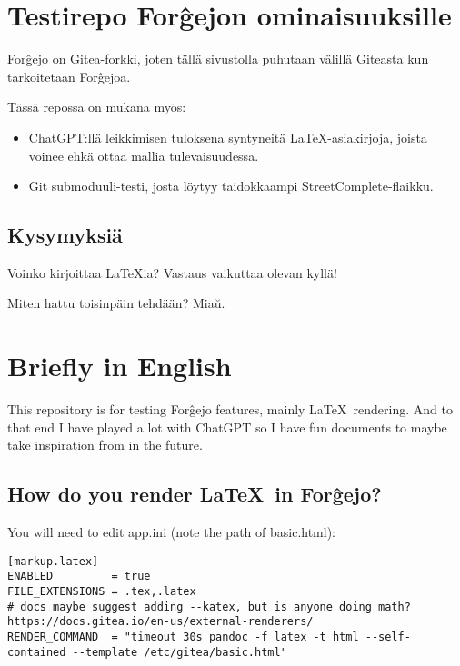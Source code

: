 \documentclass[a4paper,colorlinks,linkcolor=blue]{artikel3}
\begin{document}
\hypersetup{urlcolor=blue}

\section*{Testirepo For\^gejon ominaisuuksille}

For\^gejo on Gitea-forkki, joten tällä sivustolla puhutaan välillä Giteasta kun tarkoitetaan For\^gejoa.

Tässä repossa on mukana myös:


\begin{itemize}
    \item ChatGPT:llä leikkimisen tuloksena syntyneitä \LaTeX -asiakirjoja, joista voinee ehkä ottaa mallia tulevaisuudessa.
    \item Git submoduuli-testi, josta löytyy taidokkaampi StreetComplete-flaikku.
\end{itemize}

\subsection*{Kysymyksiä}
Voinko kirjoittaa \LaTeX ia?
Vastaus vaikuttaa olevan kyllä!

Miten hattu toisinpäin tehdään?
Mia\u{u}.


\section*{Briefly in English}

This repository is for testing For\^gejo features, mainly \LaTeX\ rendering.
And to that end I have played a lot with ChatGPT so I have fun documents to maybe take inspiration from in the future.

\subsection*{How do you render \LaTeX\ in For\^gejo?}

You will need to edit app.ini (note the path of basic.html):

\begin{verbatim}
[markup.latex]
ENABLED         = true
FILE_EXTENSIONS = .tex,.latex
# docs maybe suggest adding --katex, but is anyone doing math? https://docs.gitea.io/en-us/external-renderers/
RENDER_COMMAND  = "timeout 30s pandoc -f latex -t html --self-contained --template /etc/gitea/basic.html"
\end{verbatim}
\end{document}
